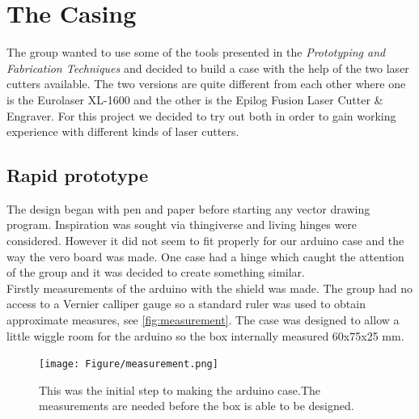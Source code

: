 \chapter{The Casing}
\label{the_casing}
The group wanted to use some of the tools presented in the \textit{Prototyping and Fabrication Techniques} and decided to build a case with the help of the two laser cutters available. The two versions are quite different from each other where one is the Eurolaser XL-1600 and the other is the Epilog Fusion Laser Cutter \& Engraver. For this project we decided to try out both in order to gain working experience with different kinds of laser cutters. 

\section{Rapid prototype}
The design began with pen and paper before starting any vector drawing program. Inspiration was sought via thingiverse and living hinges were considered. However it did not seem to fit properly for our arduino case and the way the vero board was made. One case had a hinge which caught the attention of the group and it was decided to create something similar.\\
Firstly measurements of the arduino with the shield was made. The group had no access to a Vernier calliper gauge so a standard ruler was used to obtain approximate measures, see \autoref{fig:measurement}. The case was designed to allow a little wiggle room for the arduino so the box internally measured 60x75x25 mm.

\begin{figure}[htb]
\centering
\texttt{[image: Figure/measurement.png]}
\caption{This was the initial step to making the arduino case.The measurements are needed before the box is able to be designed.}
\label{fig:measurement}
\end{figure}



